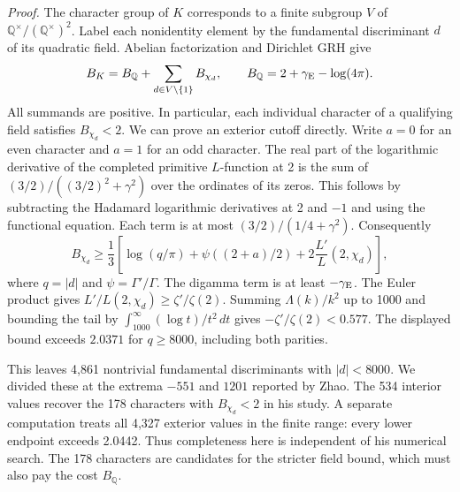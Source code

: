 \documentclass[11pt]{article}
\begin{document}
\smallskip\noindent\emph{Proof.}
The character group of $K$ corresponds to a finite subgroup $V$ of
$\mathbb Q^\times/(\mathbb Q^\times)^2$. Label each nonidentity element by
the fundamental discriminant $d$ of its quadratic field.
Abelian factorization and Dirichlet GRH give
\[
 B_K=B_{\mathbb Q}+\sum_{d\in V\setminus\{1\}} B_{\chi_d},
 \qquad B_{\mathbb Q}=2+\gamma_{\rm E}-\log(4\pi).
\]
All summands are positive. In particular, each individual character of a
qualifying field satisfies $B_{\chi_d}<2$. We can prove an exterior cutoff directly. Write $a=0$ for an even character and $a=1$ for an odd character. The real part of the logarithmic derivative of the completed primitive $L$-function at 2 is the sum of $(3/2)/((3/2)^2+\gamma^2)$ over the ordinates of its zeros. This follows by subtracting the Hadamard logarithmic derivatives at 2 and $-1$ and using the functional equation. Each term is at most $(3/2)/(1/4+\gamma^2)$. Consequently
\[
 B_{\chi_d}\ge\frac13\left[\log(q/\pi)+\psi((2+a)/2)+2\frac{L'}{L}(2,\chi_d)\right],
\]
where $q=|d|$ and $\psi=\Gamma'/\Gamma$. The digamma term is at least $-\gamma_{\rm E}$. The Euler product gives $L'/L(2,\chi_d)\ge\zeta'/\zeta(2)$. Summing $\Lambda(k)/k^2$ up to 1000 and bounding the tail by $\int_{1000}^\infty (\log t)/t^2\,dt$ gives $-\zeta'/\zeta(2)<0.577$. The displayed bound exceeds $2.0371$ for $q\ge8000$, including both parities.

This leaves 4,861 nontrivial fundamental discriminants with $|d|<8000$. We divided these at the extrema $-551$ and $1201$ reported by Zhao. The 534 interior values recover the 178 characters with $B_{\chi_d}<2$ in his study. A separate computation treats all 4,327 exterior values in the finite range: every lower endpoint exceeds 2.0442. Thus completeness here is independent of his numerical search. The 178 characters are candidates for the stricter field bound, which must also pay the cost $B_{\mathbb Q}$.
\end{document}
